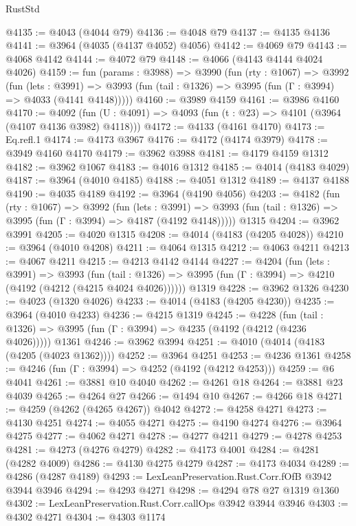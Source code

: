 \begin{lexlean}{RustStd}
\begin{coremodule}
@4135 := @4043 (@4044 @79)
@4136 := @4048 @79
@4137 := @4135 @4136
@4141 := @3964 (@4035 (@4137 @4052) @4056)
@4142 := @4069 @79
@4143 := @4068 @4142
@4144 := @4072 @79
@4148 := @4066 (@4143 @4144 @4024 @4026)
@4159 := fun (params : @3988) =>
  @3990
    (fun (rty : @1067) =>
    @3992
      (fun (lets : @3991) =>
      @3993 (fun (tail : @1326) => @3995 (fun (Γ : @3994) => @4033 (@4141 @4148)))))
@4160 := @3989 @4159
@4161 := @3986 @4160
@4170 := @4092 (fun (U : @4091) => @4093 (fun (t : @23) => @4101 (@3964 (@4107 @4136 @3982) @4118)))
@4172 := @4133 (@4161 @4170)
@4173 := Eq.refl.{1}
@4174 := @4173 @3967
@4176 := @4172 (@4174 @3979)
@4178 := @3949 @4160 @4170
@4179 := @3962 @3988
@4181 := @4179 @4159 @1312
@4182 := @3962 @1067
@4183 := @4016 @1312
@4185 := @4014 (@4183 @4029)
@4187 := @3964 (@4010 @4185)
@4188 := @4051 @1312
@4189 := @4137 @4188
@4190 := @4035 @4189
@4192 := @3964 (@4190 @4056)
@4203 := @4182
    (fun (rty : @1067) =>
    @3992
      (fun (lets : @3991) =>
      @3993 (fun (tail : @1326) => @3995 (fun (Γ : @3994) => @4187 (@4192 @4148)))))
    @1315
@4204 := @3962 @3991
@4205 := @4020 @1315
@4208 := @4014 (@4183 (@4205 @4028))
@4210 := @3964 (@4010 @4208)
@4211 := @4064 @1315
@4212 := @4063 @4211
@4213 := @4067 @4211
@4215 := @4213 @4142 @4144
@4227 := @4204
    (fun (lets : @3991) =>
    @3993
      (fun (tail : @1326) => @3995 (fun (Γ : @3994) => @4210 (@4192 (@4212 (@4215 @4024 @4026))))))
    @1319
@4228 := @3962 @1326
@4230 := @4023 (@1320 @4026)
@4233 := @4014 (@4183 (@4205 @4230))
@4235 := @3964 (@4010 @4233)
@4236 := @4215 @1319
@4245 := @4228
    (fun (tail : @1326) => @3995 (fun (Γ : @3994) => @4235 (@4192 (@4212 (@4236 @4026)))))
    @1361
@4246 := @3962 @3994
@4251 := @4010 (@4014 (@4183 (@4205 (@4023 @1362))))
@4252 := @3964 @4251
@4253 := @4236 @1361
@4258 := @4246 (fun (Γ : @3994) => @4252 (@4192 (@4212 @4253)))
@4259 := @6 @4041
@4261 := @3881 @10 @4040
@4262 := @4261 @18
@4264 := @3881 @23 @4039
@4265 := @4264 @27
@4266 := @1494 @10
@4267 := @4266 @18
@4271 := @4259 (@4262 (@4265 @4267)) @4042
@4272 := @4258 @4271
@4273 := @4130 @4251
@4274 := @4055 @4271
@4275 := @4190 @4274
@4276 := @3964 @4275
@4277 := @4062 @4271
@4278 := @4277 @4211
@4279 := @4278 @4253
@4281 := @4273 (@4276 @4279)
@4282 := @4173 @4001
@4284 := @4281 (@4282 @4009)
@4286 := @4130 @4275 @4279
@4287 := @4173 @4034
@4289 := @4286 (@4287 @4189)
@4293 := LexLeanPreservation.Rust.Corr.fOfB @3942 @3944 @3946
@4294 := @4293 @4271
@4298 := @4294 @78 @27 @1319 @1360
@4302 := LexLeanPreservation.Rust.Corr.callOps @3942 @3944 @3946
@4303 := @4302 @4271
@4304 := @4303 @1174

\end{coremodule}
\end{lexlean}
